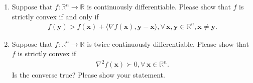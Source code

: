 \documentclass[11pt,letter,notitlepage]{article}
\theoremstyle{definition}
\begin{document}
\begin{exercise}
	\begin{enumerate}
		\item Suppose that $f:\mathbb{R}^n \to \mathbb{R}$ is continuously differentiable. Please show that $f$ is strictly convex if and only if
		      \begin{align*}
			      f(\mathbf{y})> f(\mathbf{x})+\langle\nabla f(\mathbf{x}),\mathbf{y}-\mathbf{x}\rangle, \forall\, \mathbf{x},\mathbf{y} \in\mathbb{R}^n, \mathbf{x}\not=\mathbf{y}.
		      \end{align*}
		\item  Suppose that $f:\mathbb{R}^n \to \mathbb{R}$ is twice continuously differentiable. Please show that $f$ is strictly convex if
		      \begin{align*}
			      \nabla^2 f(\mathbf{x}) \succ 0, \forall\, \mathbf{x} \in \mathbb{R}^n.
		      \end{align*}
		      Is the converse true? Please show your statement.
	\end{enumerate}
\end{exercise}
\end{document}

